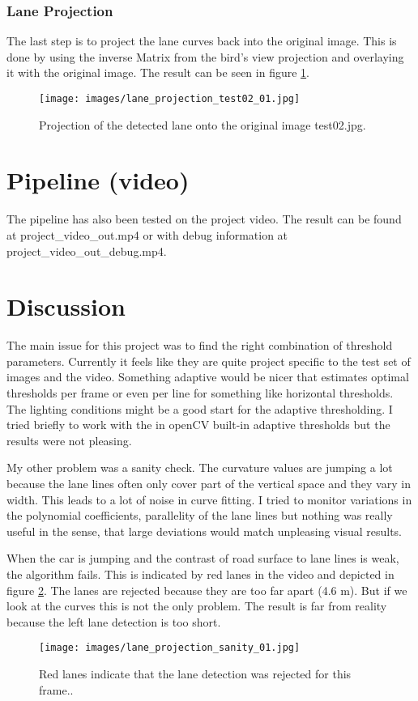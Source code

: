 \documentclass[a4paper, 11pt, DIV=14]{scrartcl}
\begin{document}
\subsubsection*{Lane Projection}
The last step is to project the lane curves back into the original image. This is done by using the inverse Matrix from the bird's view projection and overlaying it with the original image. The result can be seen in figure \ref{fig:lane_projection}.

\begin{figure}[h]
    \centering
    \texttt{[image: images/lane\_projection\_test02\_01.jpg]}

    \caption{Projection of the detected lane onto the original image test02.jpg.}
    \label{fig:lane_projection}
\end{figure}

\section{Pipeline (video)}
The pipeline has also been tested on the project video. The result can be found at project\_video\_out.mp4 or with debug information at project\_video\_out\_debug.mp4. 

\section{Discussion}
The main issue for this project was to find the right combination of threshold parameters. Currently it feels like they are quite project specific to the test set of images and the video. Something adaptive would be nicer that estimates optimal thresholds per frame or even per line for something like horizontal thresholds. The lighting conditions might be a good start for the adaptive thresholding. I tried briefly to work with the in openCV built-in adaptive thresholds but the results were not pleasing.

My other problem was a sanity check. The curvature values are jumping a lot because the lane lines often only cover part of the vertical space and they vary in width. This leads to a lot of noise in curve fitting. I tried to monitor variations in the polynomial coefficients, parallelity of the lane lines but nothing was really useful in the sense, that large deviations would match unpleasing visual results.

When the car is jumping and the contrast of road surface to lane lines is weak, the algorithm fails. This is indicated by red lanes in the video and depicted in figure \ref{fig:sanity_check}. The lanes are rejected because they are too far apart (4.6 m). But if we look at the curves this is not the only problem. The result is far from reality because the left lane detection is too short.

\begin{figure}[h]
    \centering
    \texttt{[image: images/lane\_projection\_sanity\_01.jpg]}

    \caption{Red lanes indicate that the lane detection was rejected for this frame..}
    \label{fig:sanity_check}
\end{figure} 

\printbibliography
\end{document}
